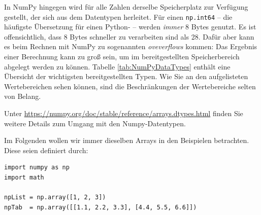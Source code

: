 In NumPy hingegen wird für alle Zahlen derselbe Speicherplatz zur Verfügung gestellt, der sich aus dem Datentypen herleitet. Für einen \texttt{np.int64} -- die häufigste Übersetzung für einen Python- -- werden \emph{immer} 8 Bytes genutzt. Es ist offensichtlich, dass 8 Bytes schneller zu verarbeiten sind als 28. Dafür aber kann es beim Rechnen mit NumPy zu sogenannten \emph{oveverflows} kommen: Das Ergebnis einer Berechnung kann zu groß sein, um im bereitgestellten Speicherbereich abgelegt werden zu können. Tabelle \ref{tab:NumPyDataTypes} enthält eine Übersicht der wichtigsten bereitgestellten Typen. Wie Sie an den aufgelisteten Wertebereichen sehen können, sind die Beschränkungen der Wertebereiche selten von Belang.

Unter \url{https://numpy.org/doc/stable/reference/arrays.dtypes.html} finden Sie weitere Details zum Umgang mit den Numpy-Datentypen.

Im Folgenden wollen wir immer dieselben Arrays in den Beispielen betrachten. Diese seien definiert durch:
\begin{codebox}
\begin{verbatim}
import numpy as np
import math

npList = np.array([1, 2, 3])
npTab  = np.array([[1.1, 2.2, 3.3], [4.4, 5.5, 6.6]])
\end{verbatim}
\end{codebox}

